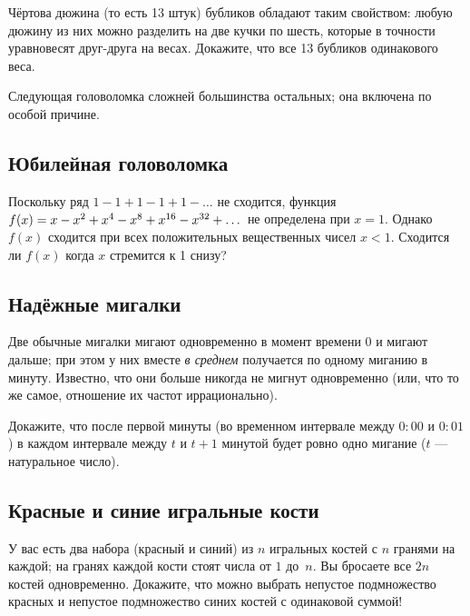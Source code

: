 Чёртова дюжина (то есть 13 штук) бубликов обладают таким свойством: любую дюжину из них можно разделить на две кучки по шесть, которые в точности уравновесят друг-друга на весах.
Докажите, что все 13 бубликов одинакового веса.

\medskip

Следующая головоломка сложней большинства остальных;
она включена по особой причине.

\subsection*{Юбилейная головоломка}

Поскольку ряд $1 - 1 + 1 - 1 + 1 - \dots$ не сходится,  функция 
$f(x)\z=x-x^2+x^4-x^8+x^{16}-x^{32}+\dots$ не определена при $x=1$.
Однако $f(x)$ сходится при всех положительных вещественных чисел $x<1$.
Сходится ли $f(x)$ когда $x$ стремится к 1 снизу?

\subsection*{Надёжные мигалки}

Две обычные мигалки мигают одновременно в момент времени $0$
и мигают дальше; при этом у них вместе \emph{в среднем} получается по одному миганию в минуту.
Известно, что они больше никогда не мигнут одновременно (или, что то же самое, отношение их частот иррационально).

Докажите, что после первой минуты (во временном интервале между $0{:}00$ и $0{:}01$) в каждом интервале между $t$ и $t + 1$ минутой будет ровно одно мигание ($t$ --- натуральное число).

\subsection*{Красные и синие игральные кости}

У вас есть два набора (красный и синий) из $n$ игральных костей с $n$ гранями на каждой;
на гранях каждой кости стоят числа от $1$ до~$n$.
Вы бросаете все $2n$ костей одновременно.
Докажите, что можно выбрать непустое подмножество красных и непустое подмножество синих костей с одинаковой суммой!
